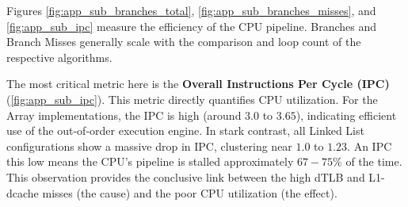 \documentclass[11pt, a4paper]{article}
\begin{document}
Figures \ref{fig:app_sub_branches_total}, \ref{fig:app_sub_branches_misses}, and \ref{fig:app_sub_ipc} measure the efficiency of the CPU pipeline. Branches and Branch Misses generally scale with the comparison and loop count of the respective algorithms.

The most critical metric here is the \textbf{Overall Instructions Per Cycle (IPC)} (\ref{fig:app_sub_ipc}). This metric directly quantifies CPU utilization. For the Array implementations, the IPC is high (around $\mathbf{3.0}$ to $\mathbf{3.65}$), indicating efficient use of the out-of-order execution engine. In stark contrast, all Linked List configurations show a massive drop in IPC, clustering near $\mathbf{1.0}$ to $\mathbf{1.23}$. An IPC this low means the CPU's pipeline is stalled approximately $67-75\%$ of the time. This observation provides the conclusive link between the high dTLB and L1-dcache misses (the cause) and the poor CPU utilization (the effect).
 
\vspace{-1ex}
\end{document}

